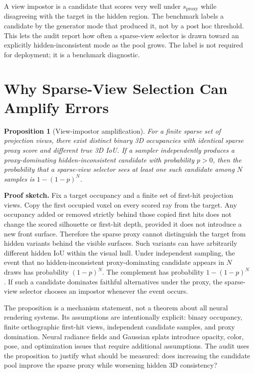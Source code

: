 \documentclass{article}
\newtheorem{proposition}{Proposition}
\begin{document}
A view impostor is a candidate that scores very well under
$s_{\mathrm{proxy}}$ while disagreeing with the target in the hidden region.
The benchmark labels a candidate by the generator mode that produced it, not by
a post hoc threshold. This lets the audit report how often a sparse-view
selector is drawn toward an explicitly hidden-inconsistent mode as the pool
grows. The label is not required for deployment; it is a benchmark diagnostic.

\section{Why Sparse-View Selection Can Amplify Errors}

\begin{proposition}[View-impostor amplification]
For a finite sparse set of projection views, there exist distinct binary 3D
occupancies with identical sparse proxy score and different true 3D IoU. If a
sampler independently produces a proxy-dominating hidden-inconsistent candidate
with probability $p>0$, then the probability that a sparse-view selector sees
at least one such candidate among $N$ samples is $1-(1-p)^N$.
\end{proposition}

\textbf{Proof sketch.}
Fix a target occupancy and a finite set of first-hit projection views. Copy the
first occupied voxel on every scored ray from the target. Any occupancy added
or removed strictly behind those copied first hits does not change the scored
silhouette or first-hit depth, provided it does not introduce a new front
surface. Therefore the sparse proxy cannot distinguish the target from hidden
variants behind the visible surfaces. Such variants can have arbitrarily
different hidden IoU within the visual hull. Under independent sampling, the
event that no hidden-inconsistent proxy-dominating candidate appears in $N$
draws has probability $(1-p)^N$. The complement has probability
$1-(1-p)^N$. If such a candidate dominates faithful alternatives under the
proxy, the sparse-view selector chooses an impostor whenever the event occurs.

The proposition is a mechanism statement, not a theorem about all neural
rendering systems. Its assumptions are intentionally explicit: binary
occupancy, finite orthographic first-hit views, independent candidate samples,
and proxy domination. Neural radiance fields and Gaussian splats introduce
opacity, color, pose, and optimization issues that require additional
assumptions. The audit uses the proposition to justify what should be measured:
does increasing the candidate pool improve the sparse proxy while worsening
hidden 3D consistency?
\end{document}

